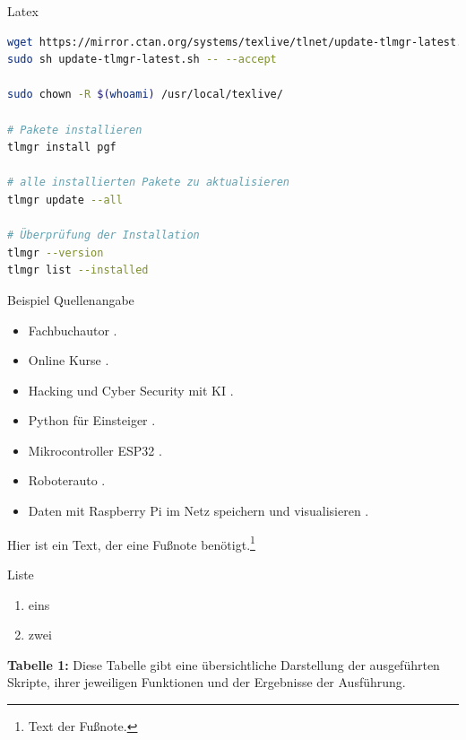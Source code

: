 \documentclass{vorlage-design-main}
\begin{document}
Latex

\begin{lstlisting}[language=bash]
wget https://mirror.ctan.org/systems/texlive/tlnet/update-tlmgr-latest.sh
sudo sh update-tlmgr-latest.sh -- --accept

sudo chown -R $(whoami) /usr/local/texlive/

# Pakete installieren
tlmgr install pgf

# alle installierten Pakete zu aktualisieren
tlmgr update --all

# Überprüfung der Installation
tlmgr --version
tlmgr list --installed
\end{lstlisting}

Beispiel Quellenangabe

\begin{itemize}

\item
  Fachbuchautor \textcite{dalwigk:2024:fachbuchautor}.
\item
  Online Kurse \textcite{schaffranek:2024:kurse}.
\item
  Hacking und Cyber Security mit KI \textcite{dalwigk:2023:hacking}.
\item
  Python für Einsteiger \textcite{dalwigk:2022:python}.
\item
  Mikrocontroller ESP32 \textcite{brandes:2023:mikrocontroller}.
\item
  Roboterauto \textcite{brandes:2022:esp32}.
\item
  Daten mit Raspberry Pi im Netz speichern und visualisieren
  \textcite{brandes:2023:daten}.
\end{itemize}

Hier ist ein Text, der eine Fußnote benötigt.\footnote{Text der Fußnote.}

Liste

\begin{enumerate}
\def\labelenumi{\arabic{enumi}.}

\item
  eins
\item
  zwei
\end{enumerate}

\textbf{Tabelle 1:} Diese Tabelle gibt eine übersichtliche Darstellung
der ausgeführten Skripte, ihrer jeweiligen Funktionen und der Ergebnisse
der Ausführung.
\end{document}
